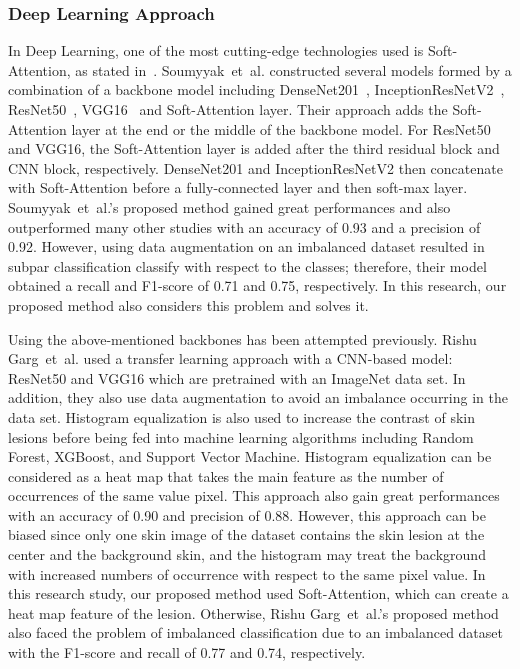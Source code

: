 \documentclass[sensors,article,accept,pdftex,moreauthors]{Definitions/mdpi}
\begin{document}
{		\subsubsection{Deep Learning Approach}
		In Deep Learning, one of the most cutting-edge technologies  used is Soft-Attention, as stated in~\mbox{\cite{03358}}. Soumyyak~et~al. constructed several models formed by a combination of a backbone model including DenseNet201~\mbox{\cite{06993}}, InceptionResNetV2~\mbox{\cite{00567}}, ResNet50~\mbox{\cite{03385,05027}}, VGG16~\mbox{\cite{1556}} and Soft-Attention layer. Their approach adds the Soft-Attention layer at the end or the middle of the backbone model. For ResNet50 and VGG16, the Soft-Attention layer is added after the third residual block and CNN block, respectively. DenseNet201 and InceptionResNetV2 then concatenate with  Soft-Attention before a fully-connected layer and then soft-max layer. Soumyyak~et~al.'s proposed method gained great performances and also outperformed many other studies with an accuracy of 0.93 and a precision of 0.92. However, using  data augmentation on an imbalanced dataset resulted in subpar classification  classify with respect to the  classes; therefore, their model obtained a  recall and F1-score of 0.71 and 0.75, respectively. In this research, our proposed method also considers this problem and solves it.
		
		Using the above-mentioned backbones has been attempted previously. Rishu Garg~et~al. \mbox{\cite{03798}} used a transfer learning approach with a CNN-based model: ResNet50 and VGG16 which are pretrained with an ImageNet data set. In addition, they also use data augmentation to avoid an imbalance occurring in  the data set. Histogram equalization is also used to increase the contrast of  skin lesions before being fed into machine learning algorithms including Random Forest, XGBoost, and Support Vector Machine. Histogram equalization can be considered as a heat map that takes the main feature as the number of occurrences of the same value pixel. This approach also gain great performances with an accuracy of 0.90 and  precision of 0.88. However, this approach can be biased since only one skin image of the dataset contains the skin lesion at the center and the background skin, and the histogram may treat the background with increased numbers of occurrence with respect to the same pixel value. In this research study, our proposed method used  Soft-Attention, which can create a heat map feature of the lesion. Otherwise, Rishu Garg~et~al.'s proposed method also faced the problem of imbalanced classification due to an imbalanced dataset with the F1-score and recall of 0.77 and 0.74, respectively.
		
}
\end{document}
